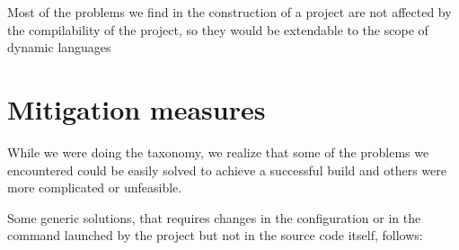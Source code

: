 Most of the problems we find in the construction of a project are not affected by the compilability of the project, so they would be extendable to the scope of dynamic languages







\section{Mitigation measures}

While we were doing the taxonomy, we realize that some of the problems we encountered could be easily solved to achieve a successful build and others were more complicated or unfeasible.

Some generic solutions, that requires changes in the configuration or in the command launched by the project but not in the source code itself, follows:

